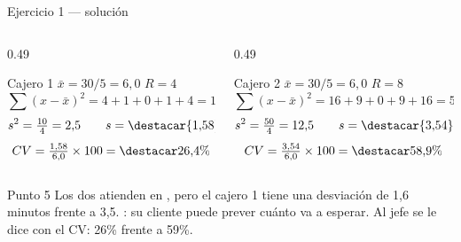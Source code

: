 \documentclass[aspectratio=169,10pt]{beamer}
\begin{document}
\begin{frame}{Ejercicio 1 — solución}
  \scriptsize
  \begin{columns}[T,onlytextwidth]
    \begin{column}{0.49\textwidth}
      \begin{block}{Cajero 1}
        \scriptsize
        $\bar{x} = 30/5 = 6{,}0$ \quad $R = 4$
        \[ \sum(x-\bar{x})^2 = 4+1+0+1+4 = 10 \]
        \[ s^2 = \tfrac{10}{4} = 2{,}5 \qquad s = \destacar{1{,}58} \]
        \[ CV = \tfrac{1{,}58}{6{,}0}\times100 = \destacar{26{,}4\%} \]
      \end{block}
    \end{column}
    \begin{column}{0.49\textwidth}
      \begin{block}{Cajero 2}
        \scriptsize
        $\bar{x} = 30/5 = 6{,}0$ \quad $R = 8$
        \[ \sum(x-\bar{x})^2 = 16+9+0+9+16 = 50 \]
        \[ s^2 = \tfrac{50}{4} = 12{,}5 \qquad s = \destacar{3{,}54} \]
        \[ CV = \tfrac{3{,}54}{6{,}0}\times100 = \destacar{58{,}9\%} \]
      \end{block}
    \end{column}
  \end{columns}

  \vspace{0.1cm}
  \begin{alertblock}{Punto 5}
    \scriptsize
    Los dos atienden en , pero el cajero 1 tiene una
    desviación de 1,6 minutos frente a 3,5. : su cliente puede prever cuánto va a esperar. Al jefe se le
    dice con el CV: 26\% frente a 59\%.
  \end{alertblock}
\end{frame}

\end{document}

